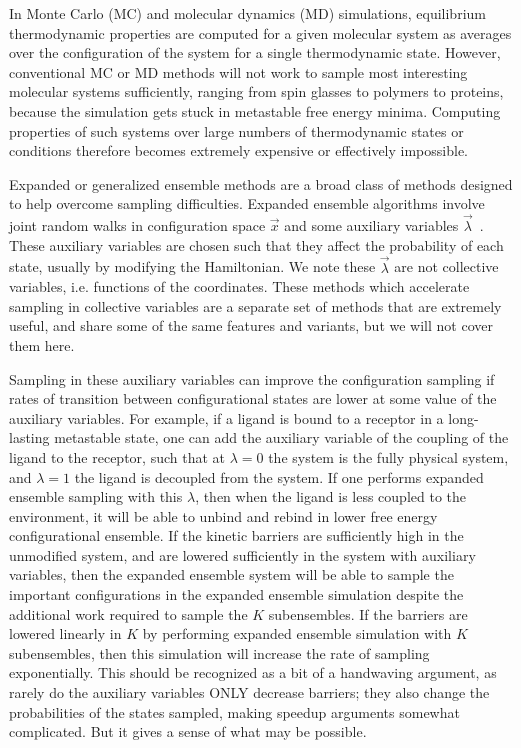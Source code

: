 \documentclass[superscriptaddress,showkeys, nofootinbib, pre, aps]{revtex4-1}
\begin{document}
In Monte Carlo (MC) and molecular dynamics (MD) simulations, equilibrium thermodynamic properties
are computed for a given molecular system as averages over the
configuration of the system for a single thermodynamic state. However,
conventional MC or MD methods will not work to sample most interesting molecular systems sufficiently, ranging from spin glasses to polymers to proteins, because the simulation gets stuck in metastable free energy minima. Computing properties of such systems over large numbers of thermodynamic states or conditions therefore becomes extremely expensive or effectively impossible.


Expanded or generalized ensemble methods are a broad class of methods designed to help overcome sampling difficulties. Expanded ensemble algorithms involve joint random walks in configuration space $\vec{x}$ and some auxiliary variables $\vec{\lambda}$~\cite{shirts_gibbssamp}.  These auxiliary variables are chosen such that they affect the probability of each state, usually by modifying the Hamiltonian.  We note these $\vec{\lambda}$ are not collective variables, i.e. functions of the coordinates. These methods which accelerate sampling in collective variables are a separate set of methods that are extremely useful, and share some of the same features and variants, but we will not cover them here.

Sampling in these auxiliary variables can improve the configuration sampling if rates of transition between configurational states are lower at some value of the auxiliary variables. For example, if a ligand is bound to a receptor in a long-lasting metastable state, one can add the auxiliary variable of the coupling of the ligand to the receptor, such that at $\lambda=0$ the system is the fully physical system, and $\lambda=1$ the ligand is decoupled from the system.  If one performs expanded ensemble sampling with this $\lambda$, then when the ligand is less coupled to the environment, it will be able to unbind and rebind in lower free energy configurational ensemble. If the kinetic barriers are sufficiently high in the unmodified system, and are lowered sufficiently in the system with auxiliary variables, then the expanded ensemble system will be able to sample the important configurations in the expanded ensemble simulation despite the additional work required to sample the $K$ subensembles.  If the barriers are lowered linearly in $K$ by performing expanded ensemble simulation with $K$ subensembles, then this simulation will increase the rate of sampling exponentially. This should be recognized as a bit of a handwaving argument, as rarely do the auxiliary variables ONLY decrease barriers; they also change the probabilities of the states sampled, making speedup arguments somewhat complicated. But it gives a sense of what may be possible.
\end{document}
